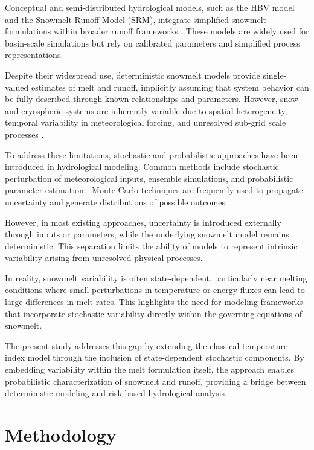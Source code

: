 \documentclass[11pt]{article}
\begin{document}
Conceptual and semi-distributed hydrological models, such as the HBV model and the Snowmelt Runoff Model (SRM), integrate simplified snowmelt formulations within broader runoff frameworks \cite{Bergstrom1976, Lindstrom1997, Martinec2008}. These models are widely used for basin-scale simulations but rely on calibrated parameters and simplified process representations.

Despite their widespread use, deterministic snowmelt models provide single-valued estimates of melt and runoff, implicitly assuming that system behavior can be fully described through known relationships and parameters. However, snow and cryospheric systems are inherently variable due to spatial heterogeneity, temporal variability in meteorological forcing, and unresolved sub-grid scale processes \cite{Dozier2011, Essery2013}.

To address these limitations, stochastic and probabilistic approaches have been introduced in hydrological modeling. Common methods include stochastic perturbation of meteorological inputs, ensemble simulations, and probabilistic parameter estimation \cite{Montanari2007, Beven2001}. Monte Carlo techniques are frequently used to propagate uncertainty and generate distributions of possible outcomes \cite{Koutsoyiannis2003}.

However, in most existing approaches, uncertainty is introduced externally through inputs or parameters, while the underlying snowmelt model remains deterministic. This separation limits the ability of models to represent intrinsic variability arising from unresolved physical processes.

In reality, snowmelt variability is often state-dependent, particularly near melting conditions where small perturbations in temperature or energy fluxes can lead to large differences in melt rates. This highlights the need for modeling frameworks that incorporate stochastic variability directly within the governing equations of snowmelt.

The present study addresses this gap by extending the classical temperature-index model through the inclusion of state-dependent stochastic components. By embedding variability within the melt formulation itself, the approach enables probabilistic characterization of snowmelt and runoff, providing a bridge between deterministic modeling and risk-based hydrological analysis.

	
	\section{Methodology}
	
\end{document}
